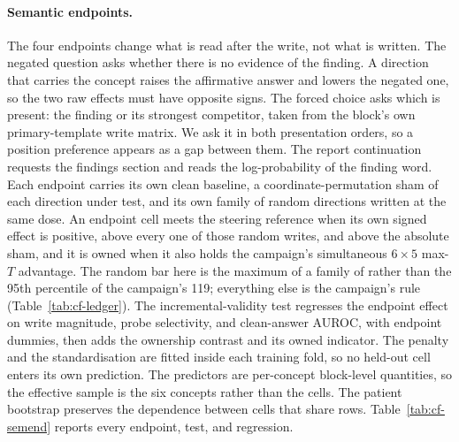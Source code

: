 \paragraph{Semantic endpoints.} The four endpoints change what is read after the write, not what is written. The negated question asks whether there is no evidence of the finding. A direction that carries the concept raises the affirmative answer and lowers the negated one, so the two raw effects must have opposite signs. The forced choice asks which is present: the finding or its strongest competitor, taken from the block's own primary-template write matrix. We ask it in both presentation orders, so a position preference appears as a gap between them. The report continuation requests the findings section and reads the log-probability of the finding word. Each endpoint carries its own clean baseline, a coordinate-permutation sham of each direction under test, and its own family of \cfSemLedgerRandom{} random directions written at the same dose. An endpoint cell meets the steering reference when its own signed effect is positive, above every one of those \cfSemLedgerRandom{} random writes, and above the absolute sham, and it is owned when it also holds the campaign's simultaneous $6\times5$ max-$T$ advantage. The random bar here is the maximum of a family of \cfSemLedgerRandom{} rather than the 95th percentile of the campaign's 119; everything else is the campaign's rule (Table~\ref{tab:cf-ledger}). The incremental-validity test regresses the endpoint effect on write magnitude, probe selectivity, and clean-answer AUROC, with endpoint dummies, then adds the ownership contrast and its owned indicator. The penalty and the standardisation are fitted inside each training fold, so no held-out cell enters its own prediction. The predictors are per-concept block-level quantities, so the effective sample is the six concepts rather than the cells. The patient bootstrap preserves the dependence between cells that share rows. Table~\ref{tab:cf-semend} reports every endpoint, test, and regression.




